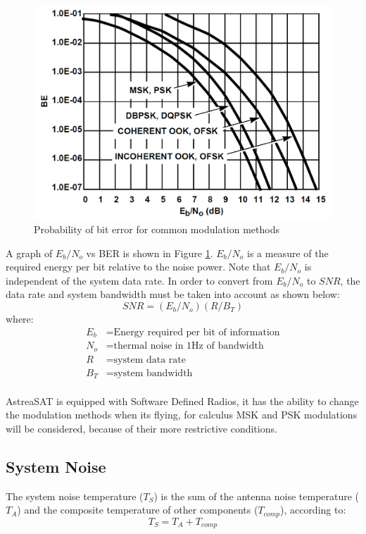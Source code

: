 \begin{figure}[h]
	\includegraphics[scale=0.3]{./sections/SatelliteDept/sections/images/BEvsSNR}
	\centering
	\caption{Probability of bit error for common modulation methods \cite{Note1998}}
	\label{BEvsSNR}
\end{figure}
\pagebreak
A graph of $E_b/N_o$
vs BER is shown in Figure \ref{BEvsSNR}. $E_b/N_o$ is a measure of the
required energy per bit relative to the noise power. Note that
$E_b/N_o$ is independent of the system data rate. In order to
convert from $E_b/N_o$ to $SNR$, the data rate and system
bandwidth must be taken into account as shown below:
\begin{equation}
SNR=(E_b/N_o)(R/B_T)
\label{SNReq}
\end{equation}
where:
\begin{align*}
	E_b&= \text{Energy required per bit of information}\\
	N_o&= \text{thermal noise in 1Hz of bandwidth}\\
	R&= \text{system data rate}\\
	B_T&= \text{system bandwidth}
\end{align*}

\paragraph{} AstreaSAT is equipped with Software Defined Radios, it has the ability to change the modulation methods when its flying, for calculus MSK and PSK modulations will be considered, because of their more restrictive conditions.

\subsection{System Noise}
The system noise temperature ($T_S$) is the sum of the antenna noise temperature ($T_A$) and
the composite temperature of other components ($T_{comp}$), according to:    \cite{Jorge2012}
\begin{equation}
T_S=T_A+T_{comp}
\end{equation}

